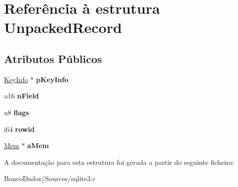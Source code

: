 \hypertarget{struct_unpacked_record}{\section{Referência à estrutura Unpacked\-Record}
\label{struct_unpacked_record}
}
\subsection*{Atributos Públicos}
\begin{DoxyCompactItemize}
\item 
\hypertarget{struct_unpacked_record_aeb43e7a1e300857cab2cbe98eacd575b}{\hyperlink{struct_key_info}{Key\-Info} $\ast$ {\bfseries p\-Key\-Info}}\label{struct_unpacked_record_aeb43e7a1e300857cab2cbe98eacd575b}

\item 
\hypertarget{struct_unpacked_record_a2c5062735cdbc5039679d255cc900668}{u16 {\bfseries n\-Field}}\label{struct_unpacked_record_a2c5062735cdbc5039679d255cc900668}

\item 
\hypertarget{struct_unpacked_record_ab24dd1a413192bae21ec613ca3b239a1}{u8 {\bfseries flags}}\label{struct_unpacked_record_ab24dd1a413192bae21ec613ca3b239a1}

\item 
\hypertarget{struct_unpacked_record_a5ec2064b28fcf43b46bf92a515e9203e}{i64 {\bfseries rowid}}\label{struct_unpacked_record_a5ec2064b28fcf43b46bf92a515e9203e}

\item 
\hypertarget{struct_unpacked_record_a3299c322ceb8b758dacc59701021ae9f}{\hyperlink{struct_mem}{Mem} $\ast$ {\bfseries a\-Mem}}\label{struct_unpacked_record_a3299c322ceb8b758dacc59701021ae9f}

\end{DoxyCompactItemize}


A documentação para esta estrutura foi gerada a partir do seguinte ficheiro\-:\begin{DoxyCompactItemize}
\item 
Banco\-Dados/\-Sources/sqlite3.\-c\end{DoxyCompactItemize}
